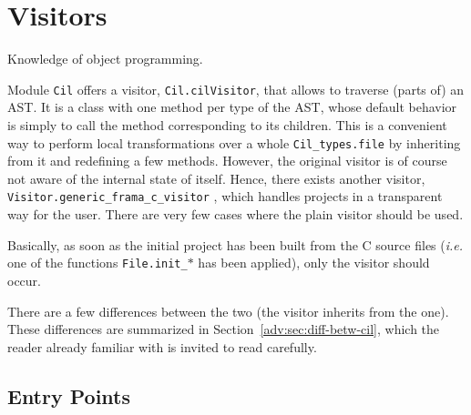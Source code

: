 
\section{Visitors}\label{adv:visitors}

\begin{prereq}
  Knowledge of \caml object programming.
\end{prereq}

Module \texttt{Cil} offers a visitor,
\verb+Cil.cilVisitor+,
that allows to traverse (parts of) an
AST. It is a class with one method per type of the AST, whose
default behavior is simply to call the method corresponding to its
children. This is a convenient way to perform local transformations over a
whole \verb+Cil_types.file+ by inheriting from it
and redefining a few methods. However, the original \cil visitor is of course
not aware of the internal state of \framac itself. Hence,
there exists another visitor, \verb+Visitor.generic_frama_c_visitor+%
, which handles
projects in a transparent way for the user. There are very few
cases where the plain \cil visitor should be used.

\begin{important}
  Basically, as soon as the initial project has been
  built from the C source files (\emph{i.e.} one of the functions
  \texttt{File.init\_$*$}%
   has been applied), only the \framac
  visitor should occur.
\end{important}

There are a few differences between the two (the \framac visitor
inherits from the \cil one).  These differences are summarized in
Section~\ref{adv:sec:diff-betw-cil}, which the reader already familiar with
\cil is invited to read carefully.

\subsection{Entry Points}

